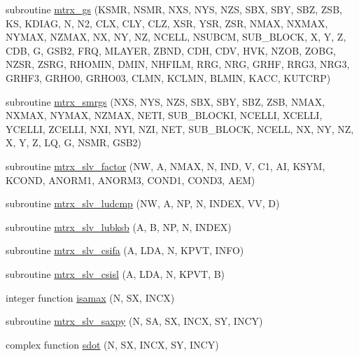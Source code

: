 \begin{DoxyCompactItemize}
\item 
subroutine \hyperlink{Marco_8f90_ab80bc274f8a08000a99dd5a512ad0729}{mtrx\+\_\+gs} (K\+S\+MR, N\+S\+MR, N\+XS, N\+YS, N\+ZS, S\+BX, S\+BY, S\+BZ, Z\+SB, KS, K\+D\+I\+AG, N, N2, C\+LX, C\+LY, C\+LZ, X\+SR, Y\+SR, Z\+SR, N\+M\+AX, N\+X\+M\+AX, N\+Y\+M\+AX, N\+Z\+M\+AX, NX, NY, NZ, N\+C\+E\+LL, N\+S\+U\+B\+CM, S\+U\+B\+\_\+\+B\+L\+O\+CK, X, Y, Z, C\+DB, G, G\+S\+B2, F\+RQ, M\+L\+A\+Y\+ER, Z\+B\+ND, C\+DH, C\+DV, H\+VK, N\+Z\+OB, Z\+O\+BG, N\+Z\+SR, Z\+S\+RG, R\+H\+O\+M\+IN, D\+M\+IN, N\+H\+F\+I\+LM, R\+RG, N\+RG, G\+R\+HF, R\+R\+G3, N\+R\+G3, G\+R\+H\+F3, G\+R\+H\+O0, G\+R\+H\+O03, C\+L\+MN, K\+C\+L\+MN, B\+L\+M\+IN, K\+A\+CC, K\+U\+T\+C\+RP)
\item 
subroutine \hyperlink{Marco_8f90_a8a072791471b5fe2faf76549b6845ab9}{mtrx\+\_\+smrgs} (N\+XS, N\+YS, N\+ZS, S\+BX, S\+BY, S\+BZ, Z\+SB, N\+M\+AX, N\+X\+M\+AX, N\+Y\+M\+AX, N\+Z\+M\+AX, N\+E\+TI, S\+U\+B\+\_\+\+B\+L\+O\+C\+KI, N\+C\+E\+L\+LI, X\+C\+E\+L\+LI, Y\+C\+E\+L\+LI, Z\+C\+E\+L\+LI, N\+XI, N\+YI, N\+ZI, N\+ET, S\+U\+B\+\_\+\+B\+L\+O\+CK, N\+C\+E\+LL, NX, NY, NZ, X, Y, Z, LQ, G, N\+S\+MR, G\+S\+B2)
\item 
subroutine \hyperlink{Marco_8f90_a09f928706f2018e58088d36d95fdfaba}{mtrx\+\_\+slv\+\_\+factor} (NW, A, N\+M\+AX, N, I\+ND, V, C1, AI, K\+S\+YM, K\+C\+O\+ND, A\+N\+O\+R\+M1, A\+N\+O\+R\+M3, C\+O\+N\+D1, C\+O\+N\+D3, A\+EM)
\item 
subroutine \hyperlink{Marco_8f90_ae7592ac4876eb1c027e45dbaecddd29d}{mtrx\+\_\+slv\+\_\+ludcmp} (NW, A, NP, N, I\+N\+D\+EX, VV, D)
\item 
subroutine \hyperlink{Marco_8f90_a12480a5c6798dd29e9fb9b68f16c280b}{mtrx\+\_\+slv\+\_\+lubksb} (A, B, NP, N, I\+N\+D\+EX)
\item 
subroutine \hyperlink{Marco_8f90_ac6e18477fef3905abe6474ab133dcfaa}{mtrx\+\_\+slv\+\_\+csifa} (A, L\+DA, N, K\+P\+VT, I\+N\+FO)
\item 
subroutine \hyperlink{Marco_8f90_a0ecd03824aa01555ad345a3140e4286a}{mtrx\+\_\+slv\+\_\+csisl} (A, L\+DA, N, K\+P\+VT, B)
\item 
integer function \hyperlink{Marco_8f90_a16c36ed9a25ca6e68931c4a00d2778e5}{isamax} (N, SX, I\+N\+CX)
\item 
subroutine \hyperlink{Marco_8f90_a3087d74c0491a5f5b127e78d96b7df0c}{mtrx\+\_\+slv\+\_\+saxpy} (N, SA, SX, I\+N\+CX, SY, I\+N\+CY)
\item 
complex function \hyperlink{Marco_8f90_a69f15032629f95611ede01cc8916bfc0}{sdot} (N, SX, I\+N\+CX, SY, I\+N\+CY)
\item 

\end{DoxyCompactItemize}
